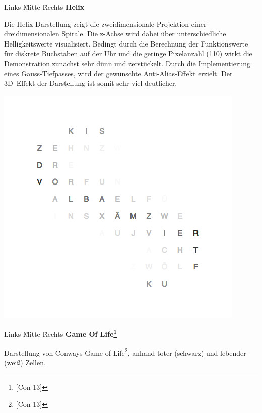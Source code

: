 \begin{multicols}{2}
\begin{tabbing}
 Links \= Mitte \= Rechts \kill
 \> \textbf{Helix}
\end{tabbing}

Die Helix-Darstellung zeigt die zweidimensionale Projektion einer dreidimensionalen Spirale. Die z-Achse wird dabei über unterschiedliche Helligkeitswerte visualisiert. Bedingt durch die Berechnung der Funktionswerte für diskrete Buchstaben auf der Uhr und die geringe Pixelanzahl (110) wirkt die Demonstration zunächst sehr dünn und zerstückelt. Durch die Implementierung eines Gauss-Tiefpasses, wird der gewünschte Anti-Alias-Effekt erzielt. Der 3D~Effekt der Darstellung ist somit sehr viel deutlicher.

{
    \centering
    \includegraphics[width=\columnwidth]{Abbildungen/Software/Demo/Helix}
}

\begin{tabbing}
 Links \= Mitte \= Rechts \kill
 \> \textbf{Game Of Life\footnote{[Con 13]}}
\end{tabbing}

Darstellung von Conways Game of Life\footnote{[Con 13]}, anhand toter (schwarz) und lebender (weiß) Zellen.


\end{multicols}
